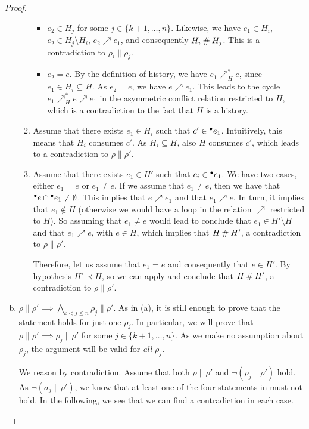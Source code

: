 \documentclass[12pt,a4paper]{article}
\newcommand{\confl}{\ensuremath\mathbin\#}
\begin{document}
\begin{proof}
\begin{enumerate}[(a)]
\begin{enumerate}[1.]
\begin{itemize}
\item $e_2 \in H_j$ for some $j \in \{k+1, \ldots, n\}$.  Likewise, we have
$e_1 \in H_i$, $e_2 \in H_j \setminus H_i$, $e_2 \nearrow e_1$, and
consequently $H_i \confl H_j$.  This is a contradiction to $\rho_i \parallel
\rho_j$.

\item $e_2 = e$.  By the definition of history, we have $e_1 \nearrow^*_H
e$, since $e_1 \in H_i \subseteq H$.  As $e_2 = e$, we have $e \nearrow e_1$.
This leads to the cycle $e_1 \nearrow^*_H e \nearrow e_1$ in the asymmetric
conflict relation restricted to $H$, which is a contradiction to the fact that
$H$ is a history.
\end{itemize}

\item Assume that there exists $e_1 \in H_i$ such that $c' \in {}^\bullet e_1$.
Intuitively, this means that $H_i$ consumes $c'$.  As $H_i \subseteq H$, also
$H$ consumes $c'$, which leads to a contradiction to $\rho \parallel \rho'$.

\item Assume that there exists $e_1 \in H'$ such that $c_i \in {}^\bullet e_1$.  We
have two cases, either $e_1 = e$ or $e_1 \ne e$.  If we assume that $e_1 \ne
e$, then we have that ${}^\bullet e \cap {}^\bullet e_1 \ne \emptyset$.  This implies that
$e \nearrow e_1$ and that $e_1 \nearrow e$.  In turn, it implies that $e_1
\notin H$ (otherwise we would have a loop in the relation $\nearrow$ restricted
to $H$).  So assuming that $e_1 \ne e$ would lead to conclude that $e_1 \in H'
\setminus H$ and that $e_1 \nearrow e$, with $e \in H$, which implies that $H
\confl H'$, a contradiction to $\rho \parallel \rho'$.

Therefore, let us assume that $e_1 = e$ and consequently that $e \in H'$.  By
hypothesis $H' \prec H$, so we can apply  and conclude that
$H \confl H'$, a contradiction to $\rho \parallel \rho'$.
\end{enumerate}

\item $\rho \parallel \rho' \implies \bigwedge_{k < j \le n} \rho_j \parallel
\rho'$.  As in (a), it is still enough to prove that the statement holds for
just one $\rho_j$.  In particular, we will prove that $\rho \parallel \rho'
\implies \rho_j \parallel \rho'$ for some $j \in \{k+1, \ldots, n\}$.  As we
make no assumption about $\rho_j$, the argument will be valid for \emph{all}
$\rho_j$.

We reason by contradiction.  Assume that both $\rho \parallel \rho'$ and $\lnot
(\rho_j \parallel \rho')$ hold.  As $\lnot (\sigma_j \parallel \rho')$, we know
that at least one of the four statements in  must not hold.
In the following, we see that we can find a contradiction in each case.


\end{enumerate}
\end{proof}
\end{document}
